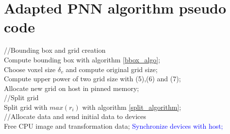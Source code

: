 \documentclass[12pt,journal,compsoc]{IEEEtran}
\begin{document}
\section{Adapted PNN algorithm pseudo code}

\begin{algorithm}

\textcolor{OliveGreen}{//Bounding box and grid creation}\\
Compute bounding box with algorithm \ref{bbox_algo};\\
Choose voxel size $\delta_v$ and compute original grid size;\\
Compute upper power of two grid size with (5),(6) and (7);\\
Allocate new grid on host in pinned memory;\\

\textcolor{OliveGreen}{//Split grid}\\
Split grid with $max(r_i)$ with algorithm \ref{split_algorithm};\\

\textcolor{OliveGreen}{//Allocate data and send initial data to devices}\\
Free CPU image and transformation data;
\textcolor{Blue}{Synchronize devices with host;}
\end{algorithm}
\end{document}
